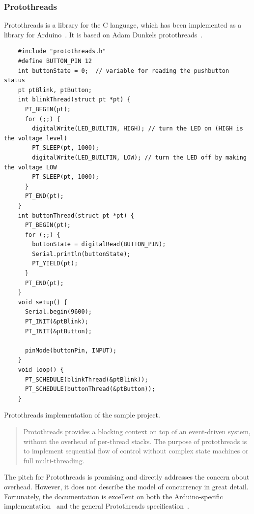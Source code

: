 \subsubsection{Protothreads}
Protothreads is a library for the C language, which has been implemented as a library for Arduino~\cite{Artin2020}. It is based on Adam Dunkels protothreads~\cite{AdamDunkelProtothreads}.


\begin{listing}[htb!]
  \centering
  \begin{verbatim}
    #include "protothreads.h"
    #define BUTTON_PIN 12
    int buttonState = 0;  // variable for reading the pushbutton status
    pt ptBlink, ptButton;
    int blinkThread(struct pt *pt) {
      PT_BEGIN(pt);
      for (;;) {
        digitalWrite(LED_BUILTIN, HIGH); // turn the LED on (HIGH is the voltage level)
        PT_SLEEP(pt, 1000);
        digitalWrite(LED_BUILTIN, LOW); // turn the LED off by making the voltage LOW
        PT_SLEEP(pt, 1000);
      }
      PT_END(pt);
    }
    int buttonThread(struct pt *pt) {
      PT_BEGIN(pt);
      for (;;) {
        buttonState = digitalRead(BUTTON_PIN);
        Serial.println(buttonState);
        PT_YIELD(pt);
      }
      PT_END(pt);
    }
    void setup() {
      Serial.begin(9600);
      PT_INIT(&ptBlink);
      PT_INIT(&ptButton);

      pinMode(buttonPin, INPUT);
    }
    void loop() {
      PT_SCHEDULE(blinkThread(&ptBlink));
      PT_SCHEDULE(buttonThread(&ptButton));
    }
  \end{verbatim}
  \caption{Protothreads implementation of the sample project.}
  \label{lst:protothreadsexample}
\end{listing}


\blockcquote{Artin2020, AdamDunkelProtothreads}{Protothreads provides a blocking context on top of an event-driven system, without the overhead of per-thread stacks. The purpose of protothreads is to implement sequential flow of control without complex state machines or full multi-threading.}

The pitch for Protothreads is promising and directly addresses the concern about overhead. However, it does not describe the model of concurrency in great detail. Fortunately, the documentation is excellent on both the Arduino-specific implementation~\cite{Artin2020} and the general Protothreads specification~\cite{AdamDunkelProtothreads}.


